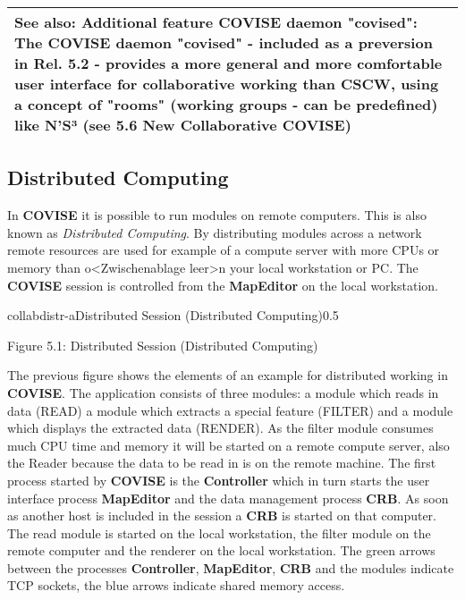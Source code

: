 \begin{longtable}{|p{14cm}|}
\hline
\newline
{\bf See also: Additional feature COVISE daemon "covised":}\newline
The COVISE daemon "covised" - included as a {\bf preversion} in Rel. 5.2 - 
provides a more general and more comfortable user interface for collaborative 
working than CSCW, using a concept of "rooms" (working groups - can be {\bf predefined}) 
like N'S³ (see {\bf 5.6 New Collaborative COVISE})\newline 
\\									
\hline
\end{longtable}


\subsection{Distributed Computing}
\label{distributed}

In {\bf COVISE} it is possible to run modules on remote computers. This is also 
known as {\it Distributed Computing}. By distributing modules across a network 
remote resources are used for example of a compute server with 
more CPUs or memory than o<Zwischenablage leer>n your local workstation or PC. The {\bf COVISE} 
session is controlled from the {\bf MapEditor} on the local workstation. 

	
\begin{covimg}{collab}{distr-a}{Distributed Session (Distributed
Computing)}{0.5}\end{covimg}
\begin{htmlonly}
Figure 5.1: Distributed Session (Distributed Computing)
\vspace{0.5cm}
\end{htmlonly} 
  
The previous figure shows the elements of an example for 
distributed working in {\bf COVISE}. The 
application consists of three modules: a module which reads in data (READ) 
a module which extracts a special feature (FILTER) and a module which displays 
the extracted data (RENDER). As the filter module consumes much CPU 
time and memory it will be started on a remote compute server, also the Reader because the data  
to be read in is on the remote machine. 
The first process started by {\bf COVISE} is the {\bf Controller} 
which in turn starts the user interface process {\bf MapEditor} and the data 
management process {\bf CRB}. As soon as another host is included in the 
session a {\bf CRB} is started on that computer. The read module is started on the 
local workstation, the filter module on the remote computer  and the 
renderer on the local workstation. The green arrows between the processes 
{\bf Controller}, {\bf MapEditor}, {\bf CRB} and the modules indicate TCP sockets, the blue arrows 
indicate shared memory access. 

